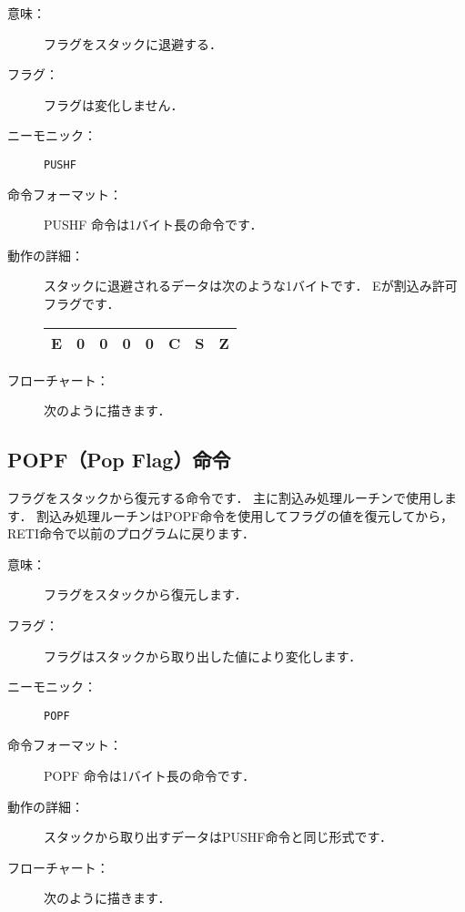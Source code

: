 \begin{description}
\item[意味：]フラグをスタックに退避する．

\item[フラグ：]フラグは変化しません．

\item[ニーモニック：] {\tt PUSHF}

\item[命令フォーマット：]PUSHF 命令は1バイト長の命令です．


\item[動作の詳細：]スタックに退避されるデータは次のような1バイトです．
Eが割込み許可フラグです．

{\tt\small\begin{center}
\begin{tabular}{|c|c|c|c|c|c|c|c|} \hline
E & 0 & 0 & 0 & 0 & C & S & Z \\
\hline
\end{tabular}
\end{center}}

\item[フローチャート：]次のように描きます．

\begin{center}
\end{center}

\end{description}


\subsection{POPF（Pop Flag）命令}

フラグをスタックから復元する命令です．
主に割込み処理ルーチンで使用します．
割込み処理ルーチンはPOPF命令を使用してフラグの値を復元してから，
RETI命令で以前のプログラムに戻ります．

\begin{description}
\item[意味：]フラグをスタックから復元します．

\item[フラグ：]フラグはスタックから取り出した値により変化します．

\item[ニーモニック：] {\tt POPF}

\item[命令フォーマット：]POPF 命令は1バイト長の命令です．


\item[動作の詳細：]スタックから取り出すデータはPUSHF命令と同じ形式です．

\item[フローチャート：]次のように描きます．

\begin{center}
\end{center}

\end{description}

